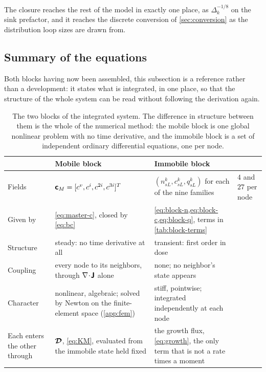 The closure reaches the rest of the model in exactly one place, as
$\Delta_k^{-1/8}$ on the sink prefactor, and it reaches the discrete conversion
of \cref{sec:conversion} as the distribution loop sizes are drawn from.

\subsection{Summary of the equations}
\label{sec:summary-equations}

Both blocks having now been assembled, this subsection is a reference rather
than a development: it states what is integrated, in one place, so that the
structure of the whole system can be read without following the derivation
again.

\begin{table}[H]
\caption{The two blocks of the integrated system. The difference in structure
between them is the whole of the numerical method: the mobile block is one
global nonlinear problem with no time derivative, and the immobile block is a
set of independent ordinary differential equations, one per node.}
\label{tab:blocks}
\centering\small
\begin{tabularx}{\textwidth}{@{}l>{\raggedright\arraybackslash}p{}
                              >{\raggedright\arraybackslash}p{}X@{}}
\toprule
& Mobile block & Immobile block & \\
\midrule
Fields & $\bm{\mathsf{c}}_M=[c^v,c^i,c^{2i},c^{3i}]^{T}$
       & $(n^k_{sL},c^k_{sL},q^k_{sL})$ for each of the nine families
       & $4$ and $27$ per node \\
\addlinespace
Given by & \cref{eq:master-c}, closed by \cref{eq:bc}
         & \cref{eq:block-n,eq:block-c,eq:block-q}, terms in
           \cref{tab:block-terms}
         & \\
\addlinespace
Structure & steady: no time derivative at all
          & transient: first order in dose
          & \\
\addlinespace
Coupling & every node to its neighbors, through
           $\nabla\!\cdot\!\bm{\mathsf{J}}$ alone
         & none; no neighbor's state appears
         & \\
\addlinespace
Character & nonlinear, algebraic; solved by Newton on the finite-element space
           (\cref{app:fem})
          & stiff, pointwise; integrated independently at each node
          & \\
\addlinespace
Each enters the other through & $\bm{\mathcal{D}}$, \cref{eq:KM}, evaluated from the
          immobile state held fixed
         & the growth flux, \cref{eq:growth}, the only term that is not a rate
           times a moment
         & \\
\bottomrule
\end{tabularx}
\end{table}

